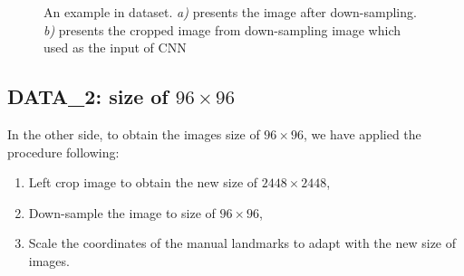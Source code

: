 \documentclass[12pt,a4paper]{article}
\begin{document}
\begin{figure}[h!]
\centering
{}\hspace{1cm}
\caption{An example in dataset. \textit{a)} presents the image after down-sampling. \textit{b)} presents the cropped image from down-sampling image which used as the input of CNN}
\label{figdata}
\end{figure}

\subsection{DATA\_2: size of $96 \times 96$}
In the other side, to obtain the images size of $96 \times 96$, we have applied the procedure following:
\begin{enumerate}[nosep]
	\item Left crop image to obtain the new size of $2448 \times 2448$,
	\item Down-sample the image to size of $96 \times 96$,
	\item Scale the coordinates of the manual landmarks to adapt with the new size of images.
\end{enumerate}
\end{document}
